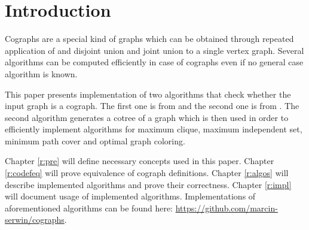 
\chapter*{Introduction}

Cographs are a special kind of graphs which can be obtained through repeated application of and disjoint union and joint union to a single vertex graph. Several algorithms can be computed efficiently in case of cographs even if no general case algorithm is known.

This paper presents implementation of two algorithms that check whether the input graph is a cograph. The first one is from \cite{habib} and the second one is from \cite{corneil}. The second algorithm generates a cotree of a graph which is then used in order to efficiently implement algorithms for maximum clique, maximum independent set, minimum path cover and optimal graph coloring.

Chapter \ref{r:pre} will define necessary concepts used in this paper. Chapter \ref{r:codefeq} will prove equivalence of cograph definitions. Chapter \ref{r:algos} will describe implemented algorithms and prove their correctness. Chapter \ref{r:impl} will document usage of implemented algorithms. Implementations of aforementioned algorithms can be found here: \url{https://github.com/marcin-serwin/cographs}.

